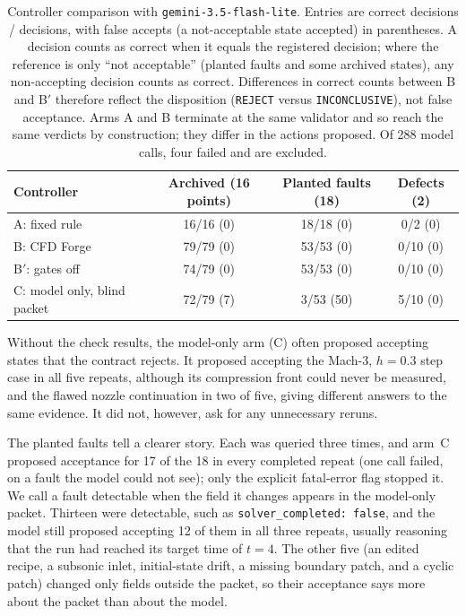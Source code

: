 \documentclass[11pt]{article}
\begin{document}
\begin{table}[!htbp]
\centering
\caption{Controller comparison with \texttt{gemini-3.5-flash-lite}. Entries
are correct decisions / decisions, with false accepts (a not-acceptable state
accepted) in parentheses. A decision counts as correct when it equals the
registered decision; where the reference is only ``not acceptable'' (planted
faults and some archived states), any non-accepting decision counts as
correct. Differences in correct counts between B and B$'$ therefore reflect
the disposition (\texttt{REJECT} versus \texttt{INCONCLUSIVE}), not false
acceptance. Arms A and B terminate at the same validator and so
reach the same verdicts by construction; they differ in the actions proposed.
Of 288 model calls, four failed and are excluded.}
\label{tab:controller}
\small
\begin{tabular}{@{}lccc@{}}
\toprule
Controller & Archived (16 points) & Planted faults (18) & Defects (2) \\
\midrule
A: fixed rule & 16/16 (0) & 18/18 (0) & 0/2 (0) \\
B: CFD Forge & 79/79 (0) & 53/53 (0) & 0/10 (0) \\
B$'$: gates off & 74/79 (0) & 53/53 (0) & 0/10 (0) \\
C: model only, blind packet & 72/79 (7) & 3/53 (50) & 5/10 (0) \\
\bottomrule
\end{tabular}
\end{table}

Without the check results, the model-only arm (C) often proposed accepting
states that the contract rejects. It proposed accepting the Mach-3, $h=0.3$
step case in all five repeats, although its compression front could never be
measured, and the flawed nozzle continuation in two of five, giving different
answers to the same evidence. It did not, however, ask for any unnecessary
reruns.

The planted faults tell a clearer story. Each was queried three times, and
arm~C proposed acceptance for 17 of the 18 in every completed repeat (one call
failed, on a fault the model could not see); only the explicit fatal-error
flag stopped it. We call a fault detectable when the field it changes appears
in the model-only packet. Thirteen were detectable, such as
\texttt{solver\_completed: false}, and the model still proposed accepting 12
of them in all three repeats, usually reasoning that the run had reached its
target time of $t=4$. The other five (an edited recipe, a subsonic inlet,
initial-state drift, a missing boundary patch, and a cyclic patch) changed only
fields outside the packet, so their acceptance says more about the packet than
about the model.
\end{document}
